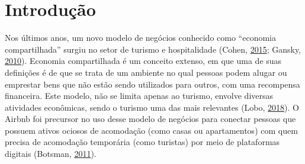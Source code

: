 \documentclass[
	12pt,				%
	a4paper,		%
	oneside,    %
	chapter=TITLE,		   %
	section=TITLE,		   %
	subsection=TITLE,	   %
	subsubsection=TITLE, %
	english,			%
	french,				%
	spanish,			%
	brazil,				%
]{abntex2}
\begin{document}
\listoffigures*
\clearpage

\listoftables*
\clearpage



\tableofcontents*
\clearpage

\textual

\hypertarget{introduuxe7uxe3o}{%
\chapter{Introdução}\label{introduuxe7uxe3o}}

Nos últimos anos, um novo modelo de negócios conhecido como ``economia
compartilhada'' surgiu no setor de turismo e hospitalidade (Cohen,
\protect\hyperlink{ref-cohen2015self}{2015}; Gansky,
\protect\hyperlink{ref-gansky2010mesh}{2010}). Economia compartilhada é
um conceito extenso, em que uma de suas definições é de que se trata de
um ambiente no qual pessoas podem alugar ou emprestar bens que não estão
sendo utilizados para outros, com uma recompensa financeira. Este
modelo, não se limita apenas ao turismo, envolve diversas atividades
econômicas, sendo o turismo uma das mais relevantes (Lobo,
\protect\hyperlink{ref-loboeconomia}{2018}). O Airbnb foi precursor no
uso desse modelo de negócios para conectar pessoas que possuem ativos
ociosos de acomodação (como casas ou apartamentos) com quem precisa de
acomodação temporária (como turistas) por meio de plataformas digitais
(Botsman, \protect\hyperlink{ref-botsman2011meu}{2011}).
\end{document}
